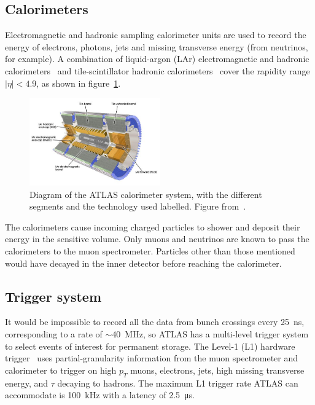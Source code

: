 \subsection{Calorimeters}

Electromagnetic and hadronic sampling calorimeter units are used to record the energy of electrons, photons, jets and missing transverse energy (from neutrinos, for example). A combination of liquid-argon (LAr) electromagnetic and hadronic calorimeters~\cite{atlas_lar_cal_tdr} and tile-scintillator hadronic calorimeters~\cite{atlas_tile_cal_tdr} cover the rapidity range $|\eta| < 4.9$, as shown in figure~\ref{fig:atlas_calorimeter}.

\begin{figure}
    \centering
    \includegraphics[width = 0.5\textwidth]{figures/atlas_calorimeter.png}
    \caption{Diagram of the ATLAS calorimeter system, with the different segments and the technology used labelled. Figure from~\cite{collaboration_atlas_2008}.}
    \label{fig:atlas_calorimeter}
\end{figure}

The calorimeters cause incoming charged particles to shower and deposit their energy in the sensitive volume. Only muons and neutrinos are known to pass the calorimeters to the muon spectrometer.  Particles other than those mentioned would have decayed in the inner detector before reaching the calorimeter. 

\subsection{Trigger system}

It would be impossible to record all the data from bunch crossings every \SI{25}{\nano\second}, corresponding to a rate of $\sim$\SI{40}{MHz}, so ATLAS has a multi-level trigger system to select events of interest for permanent storage. The Level-1 (L1) hardware trigger~\cite{atlas_l1_trigger_tdr} uses partial-granularity information from the muon spectrometer and calorimeter to trigger on high $p_T$ muons, electrons, jets, high missing transverse energy, and $\tau$ decaying to hadrons. The maximum L1 trigger rate ATLAS can accommodate is \SI{100}{kHz} with a latency of \SI{2.5}{\micro\second}. 

